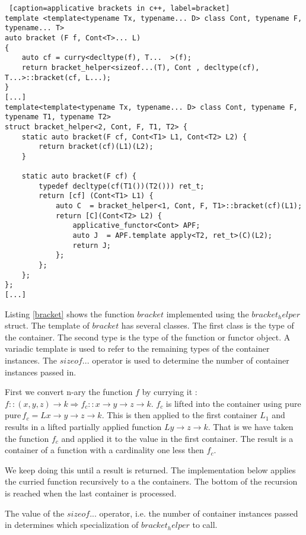 \documentclass[12pt,fleqn]{article}
\begin{document}
%
%
%
\begin {lstlisting} [caption=applicative brackets in c++, label=bracket]
template <template<typename Tx, typename... D> class Cont, typename F, typename... T> 
auto bracket (F f, Cont<T>... L) 
{
	auto cf = curry<decltype(f), T...  >(f);	
	return bracket_helper<sizeof...(T), Cont , decltype(cf), T...>::bracket(cf, L...);
} 
[...]
template<template<typename Tx, typename... D> class Cont, typename F, typename T1, typename T2>
struct bracket_helper<2, Cont, F, T1, T2> {
	static auto bracket(F cf, Cont<T1> L1, Cont<T2> L2) {
		return bracket(cf)(L1)(L2);
	}

	static auto bracket(F cf) {
		typedef decltype(cf(T1())(T2())) ret_t;
		return [cf] (Cont<T1> L1) {
			auto C  = bracket_helper<1, Cont, F, T1>::bracket(cf)(L1);
			return [C](Cont<T2> L2) { 
				applicative_functor<Cont> APF;
				auto J  = APF.template apply<T2, ret_t>(C)(L2);
				return J;
			};
		};
	};
};
[...]
\end{lstlisting}
%
%
%
%
%

Listing \ref{bracket} shows the function $bracket$ implemented using the $bracket_helper$ struct. 
The template of $bracket$ has several classes.
The first class is the type of the container. The second type is the type of the function or functor object.
A variadic template is used to refer to the remaining types of the container instances. 
The $sizeof...$ operator is used to determine the number of container instances passed in.


First we convert n-ary the function $f$ by currying it : $f::(x,y,z) \rightarrow k \Rightarrow f_c::x \rightarrow y \rightarrow z \rightarrow k$. 
$f_c$ is lifted into the container using pure $ \mbox{pure} \, f_c = L x \rightarrow y \rightarrow z \rightarrow k$. 
This is  then applied to the first container $L_1$ and results in a lifted partially applied function $L y \rightarrow z \rightarrow k$. 
That is we have taken the function $f_c$ and applied it to the value in the first container. The result is a container of a function 
with a cardinality one less then $f_c$.

We keep doing this until a result is returned.
The implementation below applies the curried function recursively to a the containers. 
The bottom of the recursion is reached when the last container is processed.

The value of the $sizeof...$ operator, i.e. the number of container instances passed in determines which specialization of  
$bracket_helper$ to call.
\end{document}
